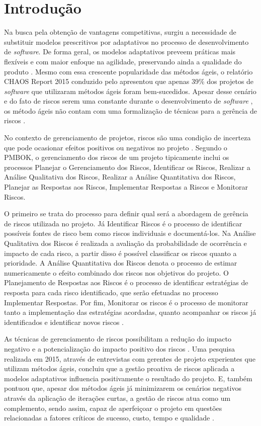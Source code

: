 \documentclass[
    12pt,       %
    openright,      %
    twoside,      %
    a4paper,      %
    english,      %
    french,       %
    spanish,      %
    brazil,       %
    ]{abntex2}
\begin{document}
\section{Introdução}

Na busca pela obtenção de vantagens competitivas, surgiu a necessidade de substituir modelos prescritivos por adaptativos no processo de desenvolvimento de \textit{software}. De forma geral, os modelos adaptativos preveem práticas mais flexíveis e com maior enfoque na agilidade, preservando ainda a qualidade do produto \cite{Rech:2013}. Mesmo com essa crescente popularidade das métodos ágeis, o relatório CHAOS Report 2015 conduzido pelo   apresentou que apenas 39\% dos projetos de \textit{software} que utilizaram métodos ágeis foram bem-sucedidos. Apesar desse cenário e do fato de riscos serem uma constante durante o desenvolvimento de \textit{software} \cite{Cunha:2013}, os método ágeis não contam com uma formalização de técnicas para a gerência de riscos \cite{Tomanek:2015}.

No contexto de gerenciamento de projetos, riscos são uma condição de incerteza que pode ocasionar efeitos positivos ou negativos no projeto \cite{PMBOK:2017}. Segundo o PMBOK, o gerenciamento dos riscos de um projeto tipicamente inclui os processos Planejar o Gerenciamento dos Riscos, Identificar os Riscos, Realizar a Análise Qualitativa dos Riscos, Realizar a Análise Quantitativa dos Riscos, Planejar as Respostas aos Riscos, Implementar Respostas a Riscos e Monitorar Riscos. 

O primeiro se trata do processo para definir qual será a abordagem de gerência de riscos utilizada no projeto. Já Identificar Riscos é o processo de identificar possíveis fontes de risco bem como riscos individuais e documentá-los. Na Análise Qualitativa dos Riscos é realizada a avaliação da probabilidade de ocorrência e impacto de cada risco, a partir disso é possível classificar os riscos quanto a prioridade. A Análise Quantitativa dos Riscos denota o processo de estimar numericamente o efeito combinado dos riscos nos objetivos do projeto. O Planejamento de Respostas aos Riscos é o processo de identificar estratégias de resposta para cada risco identificado, que serão efetuadas no processo Implementar Respostas. Por fim, Monitorar os riscos é o processo de monitorar tanto a implementação das estratégias acordadas, quanto acompanhar os riscos já identificados e identificar novos riscos \cite{PMBOK:2017}.

As técnicas de gerenciamento de riscos possibilitam a redução do impacto negativo e a potencialização do impacto positivo dos riscos \cite{Milare:2019}. Uma pesquisa realizada em 2015, através de entrevistas com gerentes de projeto experientes que utilizam métodos ágeis, concluiu que a gestão proativa de riscos aplicada a modelos adaptativos influencia positivamente o resultado do projeto. E, também pontuou que, apesar dos métodos ágeis já minimizarem os cenários negativos através da aplicação de iterações curtas, a gestão de riscos atua como um complemento, sendo assim, capaz de aperfeiçoar o projeto em questões relacionadas a fatores críticos de sucesso, custo, tempo e qualidade \cite{Gold:2015}.
\end{document}
